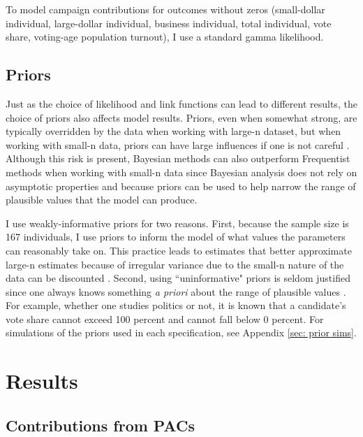 \documentclass[12pt]{article}
\begin{document}
To model campaign contributions for outcomes without zeros (small-dollar individual, large-dollar individual, business individual, total individual, vote share, voting-age population turnout), I use a standard gamma likelihood.

\subsection{Priors}

Just as the choice of likelihood and link functions can lead to different results, the choice of priors also affects model results. Priors, even when somewhat strong, are typically overridden by the data when working with large-n dataset, but when working with small-n data, priors can have large influences if one is not careful \citep{mcneish2016}. Although this risk is present, Bayesian methods can also outperform Frequentist methods when working with small-n data since Bayesian analysis does not rely on asymptotic properties and because priors can be used to help narrow the range of plausible values that the model can produce. 

I use weakly-informative priors for two reasons. First, because the sample size is 167 individuals, I use priors to inform the model of what values the parameters can reasonably take on. This practice leads to estimates that better approximate large-n estimates because of irregular variance due to the small-n nature of the data can be discounted \citep{mcneish2016}. Second, using ``uninformative" priors is seldom justified since one always knows something \textit{a priori} about the range of plausible values \citep{gelman2008a}. For example, whether one studies politics or not, it is known that a candidate's vote share cannot exceed 100 percent and cannot fall below 0 percent. For simulations of the priors used in each specification, see Appendix \ref{sec: prior sims}.


\section{Results}

\subsection{Contributions from PACs}
\end{document}
